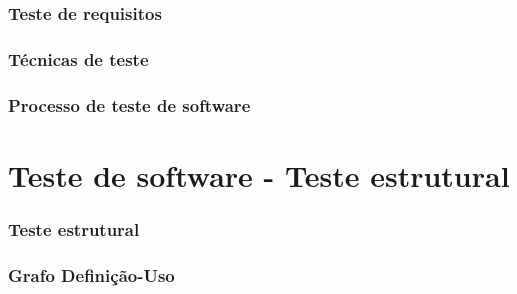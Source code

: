 \documentclass[utf8, usepdftitle=false, svgnames, color={table,
fixpdftex, hyperref, fixinclude, xcdraw}, t, brazil]{beamer}
\begin{document}
 \section{Teste de requisitos}
 

 \section{Técnicas de teste}
  
 
 \section{Processo de teste de software}
  
 
%  
%  
% 
%  
%  
%   
 
 \part{Teste de software - Teste estrutural}
 
 \section{Teste estrutural}
 
 
 \section{Grafo Definição-Uso}
 
\end{document}
